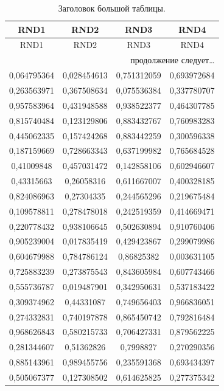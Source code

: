 \documentclass[a4paper,12pt]{article}
\begin{document}
\begin{longtable}{|c|c|c|c|}
	\caption{Заголовок большой таблицы.}\\
	\hline
	\textbf{RND1} & \textbf{RND2} & \textbf{RND3} & \textbf{RND4} \\ \hline
	\endfirsthead
	\hline
	RND1 & RND2 & RND3 & RND4 \\ \hline
	\endhead
	\hline
	\multicolumn{4}{r}{продолжение следует\ldots} \
	\endfoot
	\hline
	\endlastfoot

0,576745371 & 0,435853468 & 0,36384912 & 0,299047979 \\ 
0,064795364 & 0,028454613 & 0,751312059 & 0,693972684 \\
0,263563971 & 0,367508634 & 0,075536384 & 0,337780707 \\
0,957583964 & 0,431948588 & 0,938522377 & 0,464307785 \\
0,815740484 & 0,123129806 & 0,883432767 & 0,760983283 \\
0,445062335 & 0,157424268 & 0,883442259 & 0,300596338 \\
0,187159669 & 0,728663343 & 0,637199982 & 0,765684528 \\
0,41009848 & 0,457031472 & 0,142858106 & 0,602946607 \\
0,43315663 & 0,26058316 & 0,611667007 & 0,400328185 \\
0,824086963 & 0,27304335 & 0,244565296 & 0,219675484 \\
0,109578811 & 0,278478018 & 0,242519359 & 0,414669471 \\
0,220778432 & 0,938106645 & 0,502630894 & 0,910760406 \\
0,905239004 & 0,017835419 & 0,429423867 & 0,299079986 \\
0,604679988 & 0,784786124 & 0,86825382 & 0,003631105 \\
0,725883239 & 0,273875543 & 0,843605984 & 0,607743466 \\
0,555736787 & 0,019487901 & 0,342950631 & 0,537183422 \\
0,309374962 & 0,44331087 & 0,749656403 & 0,966836051 \\
0,274332831 & 0,740197878 & 0,865450742 & 0,792816484 \\
0,968626843 & 0,580215733 & 0,706427331 & 0,879562225 \\
0,281344607 & 0,51362826 & 0,7998827 & 0,270290356 \\
0,885143961 & 0,989455756 & 0,235591368 & 0,693434397 \\
0,505067377 & 0,127308502 & 0,614625825 & 0,277375342 \\

\end{longtable}
\end{document}
